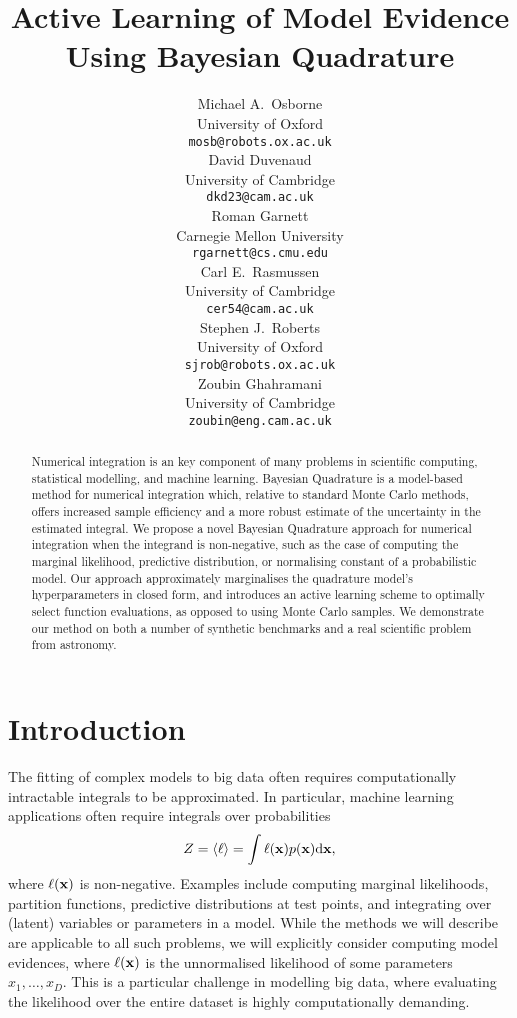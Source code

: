 \documentclass{article} %
\title{Active Learning of Model Evidence \\Using Bayesian Quadrature }
\author{
Michael A.~Osborne \\
University of Oxford\\
\texttt{mosb@robots.ox.ac.uk} \\
\And
David Duvenaud \\
University of Cambridge \\
\texttt{dkd23@cam.ac.uk} \\
\And
Roman Garnett \\
Carnegie Mellon University\\
\texttt{rgarnett@cs.cmu.edu} \\
\AND
Carl E.~Rasmussen \\
University of Cambridge \\
\texttt{cer54@cam.ac.uk} \\
\And
Stephen J.~Roberts \\
University of Oxford \\
\texttt{sjrob@robots.ox.ac.uk} \\
\And
Zoubin Ghahramani \\
University of Cambridge \\
\texttt{zoubin@eng.cam.ac.uk} \\
}
\begin{document}
 

\maketitle

\begin{abstract} 
Numerical integration is an key component of many problems in scientific computing, statistical modelling, and machine learning. Bayesian Quadrature is a model-based method for numerical integration which, relative to standard Monte Carlo methods, offers increased sample efficiency and a more robust estimate of the uncertainty in the estimated integral. We propose a novel Bayesian Quadrature approach for numerical integration when the integrand is non-negative, such as the case of computing the marginal likelihood, predictive distribution, or normalising constant of a probabilistic model. Our approach approximately marginalises the quadrature model's hyperparameters in closed form, and introduces an active learning scheme to optimally select function evaluations, as opposed to using Monte Carlo samples. We demonstrate our method on both a number of synthetic benchmarks and a real scientific problem from astronomy.
\end{abstract} 

\section{Introduction}

The fitting of complex models to big data often requires computationally intractable integrals to be approximated. In particular, machine learning applications often require integrals over probabilities
\begin{equation}\label{eq:ev}
Z = \inty{\lfn} = \int \lfn(\vlfv) p(\vlfv) \ud\vlfv,
\end{equation}
where $\ell(\vlfv)$ is non-negative.  Examples include computing marginal likelihoods, partition functions, predictive distributions at test points, and integrating over (latent) variables or parameters in a model. While the methods we will describe are applicable to all such problems, we will explicitly consider computing model evidences, where $\ell(\vlfv)$ is the unnormalised likelihood of some parameters $x_1, \dots, x_D$. This is a particular challenge in modelling big data, where evaluating the likelihood over the entire dataset is highly computationally demanding. 

\end{document}
